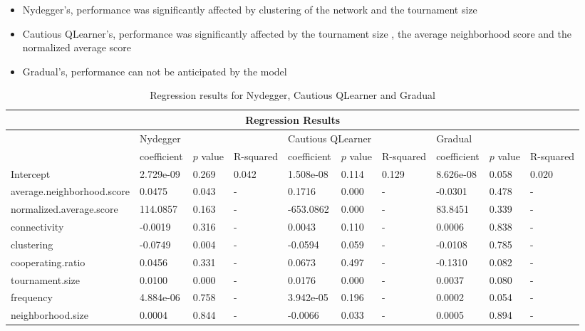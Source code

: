 \begin{itemize}
	\item Nydegger's, performance was significantly affected by clustering of the network
				and the tournament size
	\item Cautious QLearner's, performance was significantly affected by the tournament size
				, the average neighborhood score and the normalized average score
	\item Gradual's, performance can not be anticipated by the model
\end{itemize}

\begin{table}[!hbtp]
	\centering
	\begin{adjustbox}{width=0.7\textwidth}
		\small
		\begin{tabular}{|l|l|l|l|l|l|l|l|l|l|}
			\hline
			\multicolumn{10}{|c|}{Regression Results}                                                                       \\ \hline
			& \multicolumn{3}{l|}{Nydegger} & \multicolumn{3}{l|}{Cautious QLearner} & \multicolumn{3}{l|}{Gradual} \\ \hline
			  & coefficient & \(p\) value & R-squared & coefficient & \(p\) value & R-squared & coefficient & \(p\) value & R-squared    \\ \hline

			Intercept                  &  2.729e-09   & 0.269    & 0.042 		& 1.508e-08  &    0.114   & 0.129		& 8.626e-08   &  0.058 &  0.020       \\ \hline
			average.neighborhood.score &     0.0475   & 0.043    & - 				&    0.1716  &    0.000   & -  			&   -0.0301   &  0.478 &  -					\\ \hline
			normalized.average.score   &   114.0857   & 0.163    & - 				& -653.0862  &    0.000   & - 			&   83.8451   &  0.339 &  -						\\ \hline
			connectivity               &    -0.0019   & 0.316    & - 				&    0.0043  &    0.110   & - 		 	&    0.0006   &  0.838 &  -  					\\ \hline
			clustering                 &    -0.0749   & 0.004    & - 				&   -0.0594  &    0.059   & -  			&   -0.0108   &  0.785 & 	-					\\ \hline
			cooperating.ratio          &     0.0456   & 0.331    & - 				&    0.0673  &    0.497   & - 			&   -0.1310   &  0.082 &  -						\\ \hline
			tournament.size            &     0.0100   & 0.000    & - 				&    0.0176  &    0.000   & - 		  &    0.0037   &  0.080 & 	-						\\ \hline
			frequency                  &  4.884e-06   & 0.758    & -  			& 3.942e-05  &    0.196   & - 			&    0.0002   &  0.054 &  -		 			\\ \hline
			neighborhood.size          &     0.0004   & 0.844    & - 				&   -0.0066  &    0.033   & -  			&    0.0005   &  0.894 &  -						\\ \hline

		\end{tabular}
	\end{adjustbox}
	\caption{Regression results for Nydegger, Cautious QLearner and Gradual}
	\label{reg-for-top}
\end{table}

